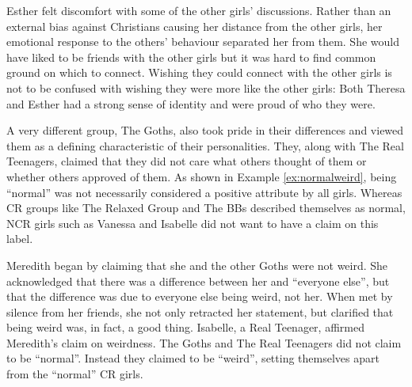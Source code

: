 \vspace{5 mm}

\noindent Esther felt discomfort with some of the other girls' discussions. Rather than an external bias against Christians causing her distance from the other girls, her emotional response to the others' behaviour separated her from them. She would have liked to be friends with the other girls but it was hard to find common ground on which to connect. Wishing they could connect with the other girls is not to be confused with wishing they were more like the other girls: Both Theresa and Esther had a strong sense of identity and were proud of who they were.

A very different group, The Goths, also took pride in their differences and viewed them as a defining characteristic of their personalities. They, along with The Real Teenagers, claimed that they did not care what others thought of them or whether others approved of them. As shown in Example \ref{ex:normalweird}, being ``normal'' was not necessarily considered a positive attribute by all girls. Whereas CR groups like The Relaxed Group and The BBs described themselves as normal, NCR girls such as Vanessa and Isabelle did not want to have a claim on this label.

\label{ex:normalweird}

\vspace{5 mm}

\noindent Meredith began by claiming that she and the other Goths were not weird. She acknowledged that there was a difference between her and ``everyone else'', but that the difference was due to everyone else being weird, not her. When met by silence from her friends, she not only retracted her statement, but clarified that being weird was, in fact, a good thing. Isabelle, a Real Teenager, affirmed Meredith's claim on weirdness. The Goths and The Real Teenagers did not claim to be ``normal''. Instead they claimed to be ``weird'', setting themselves apart from the ``normal'' CR girls. 

